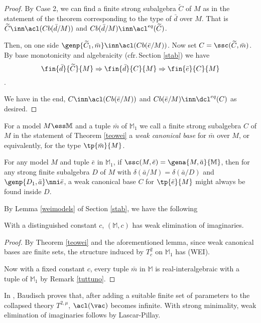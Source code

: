 \begin{proof}
By Case 2, we can find a finite strong subalgebra $\widetilde{C}$ of $M$ as in the statement of the theorem corresponding
to the type of $\bar d$ over $M$. That is $\widetilde{C}\inn\acl(Cb(\bar d/M))$ and $Cb(\bar d/M)\inn\acl^{eq}(\widetilde{C})$.

Then, on one side $\genp{\widetilde{C}_{1},\bar m}\inn\acl(Cb(\bar e/M))$.
Now set $C=\ssc(\widetilde{C},\bar m)$. By base monotonicity and algebraicity (cfr.{\,}Section \ref{stab}) we have
$$\fin{\bar d}{\widetilde{C}}{M}\Rightarrow\fin{\bar d}{C}{M}\Rightarrow\fin{\bar e}{C}{M}$$
.

We have in the end, $C\inn\acl(Cb(\bar e/M))$ and $Cb(\bar e/M)\inn\dcl^{eq}(C)$ as desired.
\end{proof}

\begin{dfn}\label{gbase}
For a model $M\ess\mathbb{M}$ and a tuple $\bar m$ of $\mathbb{M}_{1}$ we call a finite strong subalgebra $C$ of $M$ in the 
statement of Theorem \ref{teowei} a {\em weak canonical base} for $\bar m$ over $M$, or equivalently,
for the type $\tp{\bar m}{M}$.
\end{dfn}
\begin{rem}\label{re:gbase}
For any model $M$ and tuple $\bar e$ in $\mathbb{M}_{1}$,
if $\ssc(M,\bar e)=\gena{M,\bar a}{\mathbb{M}}$, then for any strong finite subalgebra $D$ of $M$ with
$\delta(\bar a/M)=\delta(\bar a/D)$ and $\genp{D_{1},\bar a}\nni\bar e$,
a weak canonical base $C$ for $\tp{\bar e}{M}$ might always be found inside $D$.
\end{rem}

\medskip
By Lemma \ref{weimodels} of Section \ref{stab}, we have the following
\begin{cor}\label{weiuno}
With a distinguished constant $c$, $(\mathbb{M},c)$ has weak elimination of imaginaries.
\end{cor}
\begin{proof}
By Theorem \ref{teowei} and the aforementioned lemma, since weak canonical bases
are finite sets, the structure induced by $T^{2}_{c}$ on $\mathbb{M}_{1}$ has (WEI).

\smallskip
Now with a fixed constant $c$, every tuple $\bar m$ in $\mathbb{M}$ is real-interalgebraic
with a tuple of $\mathbb{M}_{1}$ by Remark \ref{tuttuno}.
\end{proof}
In \cite{bad}, Baudisch proves that, after adding a suitable finite set of parameters to the collapsed
theory $T^{2,\mu}$, $\acl(\vac)$ becomes infinite. With strong minimality, weak elimination of imaginaries follows by Lascar-Pillay.

